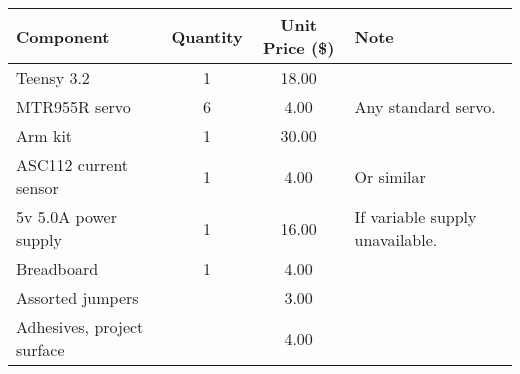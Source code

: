 \documentclass{article}
\begin{document}
\begin{center}
	\begin{tabular}{ l c c  p{3cm} }
		\toprule
		Component & Quantity & Unit Price (\$) & Note \\ \midrule
		Teensy 3.2 & 1 & 18.00 &  \\ 
		MTR955R servo & 6 & 4.00 & Any standard servo.\\ 
		Arm kit & 1 & 30.00 & \\
		ASC112 current sensor & 1 & 4.00 & Or similar\\
		5v 5.0A power supply & 1 & 16.00 & If variable supply unavailable. \\ 
		Breadboard & 1 & 4.00 & \\
		Assorted jumpers & & 3.00 & \\
		Adhesives, project surface & & 4.00 & \\
		\bottomrule
		
	\end{tabular}
\end{center}
\end{document}
